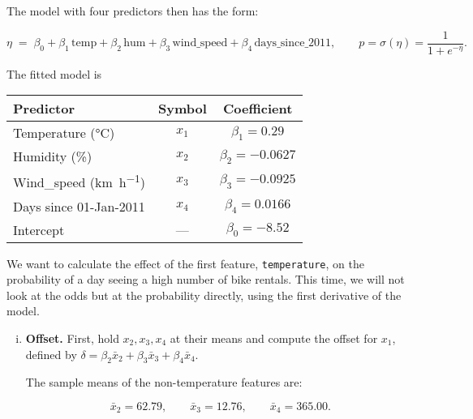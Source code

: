 {\begin{enumerate}[a)]
    The model with four predictors then has the form:
    
    \[
    \eta  \;=\;
    \beta_0
    + \beta_1\,\text{temp}
    + \beta_2\,\text{hum}
    + \beta_3\,\text{wind\_speed}
    + \beta_4\,\text{days\_since\_2011},
    \qquad
    p=\sigma(\eta)=\frac{1}{1+e^{-\eta}} .
    \]

    The fitted model is
    
    \begin{center}
    \begin{tabular}{lcc}
        \toprule
            Predictor & Symbol & Coefficient \\
        \midrule
            Temperature (\si{\celsius})            & \(x_1\) & \(\beta_1 =  0.29\) \\
            Humidity (\si{\percent})               & \(x_2\) & \(\beta_2 = -0.0627\) \\
            Wind\_speed (\si{\kilo\metre\per\hour})  & \(x_3\) & \(\beta_3 = -0.0925\) \\
            Days since 01-Jan-2011                 & \(x_4\) & \(\beta_4 =  0.0166\) \\
        \midrule
            Intercept                              & —       & \(\beta_0 = -8.52\) \\
        \bottomrule
    \end{tabular}
    \end{center}

    We want to calculate the effect of the first feature, \texttt{temperature}, on the probability of a day seeing a high number of bike rentals. 
    This time, we will not look at the odds but at the probability directly, using the first derivative of the model.
    
    \begin{enumerate}[(i)]
    
        \item\textbf{Offset.}  
        First, hold \(x_2,x_3,x_4\) at their means and compute the offset for \(x_1\), defined by
        \(\displaystyle \delta = \beta_2\bar{x}_2+\beta_3\bar{x}_3+\beta_4\bar{x}_4\).

        The sample means of the non-temperature features are:
    
        \[
        \bar{x}_2 = 62.79,\qquad
        \bar{x}_3 = 12.76,\qquad
        \bar{x}_4 = 365.00.
        \]
    

\end{enumerate}
\end{enumerate}}
